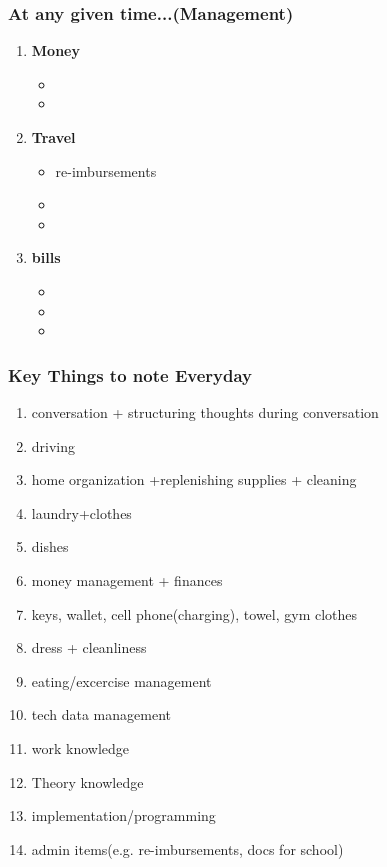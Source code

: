 \begin{frame}
\frametitle{At any given time...(Management)}
\begin{enumerate}
\item \small \textbf{Money}
\begin{itemize}
\item \tiny
\item \tiny
\end{itemize}
\item \small \textbf{Travel}
\begin{itemize}
\item \tiny re-imbursements
\item \tiny
\item \tiny
\end{itemize}
\item \small \textbf{bills}
\begin{itemize}
\item \tiny
\item \tiny
\item \tiny
\end{itemize}
\end{enumerate}
\end{frame}

\begin{frame}
\frametitle{Key Things to note Everyday}
\begin{enumerate}
\item \tiny conversation + structuring thoughts during conversation
\item \tiny driving
\item \tiny home organization +replenishing supplies + cleaning
\item \tiny laundry+clothes
\item \tiny dishes
\item \tiny money management + finances
\item \tiny keys, wallet, cell phone(charging), towel, gym clothes
\item \tiny dress + cleanliness
\item \tiny eating/excercise management
\item \tiny tech data management
\item \tiny work knowledge
\item \tiny Theory knowledge
\item \tiny implementation/programming
\item \tiny admin items(e.g. re-imbursements, docs for school)
\end{enumerate}
\end{frame}
